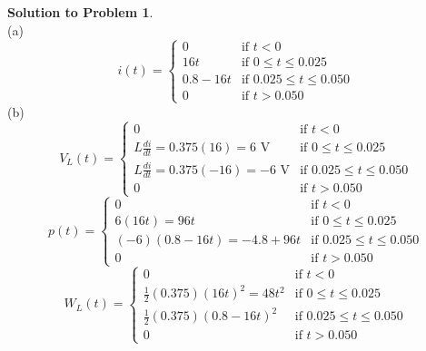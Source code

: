 \documentclass[11pt,letterpaper]{article}
\theoremstyle{definition}
\newtheorem{solprob}{\textcolor{solproblemcolor}{Solution to Problem}}  %
\begin{document}
\noindent\makebox[\linewidth]{\color{rouge_poly}{\rule{\textwidth}{1.3pt}}}

\begin{solprob} \text{}\\
    (a)
    \begin{equation}
    i(t)=\begin{cases}
    0 & \text{if } t<0\\
    16t & \text{if } 0\leq t\leq 0.025\\
    0.8-16t & \text{if } 0.025\leq t \leq 0.050\\
    0 & \text{if } t>0.050
    \end{cases}
    \end{equation}
    (b)
    \begin{equation}
    V_L(t)=\begin{cases}
    0 & \text{if } t<0\\
    L\frac{di}{dt}=0.375(16)=6\text{ V} & \text{if } 0\leq t \leq0.025\\
    L\frac{di}{dt}=0.375(-16)=-6 \text{ V} & \text{if } 0.025\leq t \leq 0.050\\
    0 & \text{if } t>0.050
    \end{cases}
    \end{equation}
    \begin{equation}
    p(t)=\begin{cases}
    0 & \text{if } t<0\\
    6(16t)=96t & \text{if } 0\leq t\leq 0.025\\
    (-6)(0.8-16t)=-4.8+96t & \text{if } 0.025\leq t\leq 0.050\\
    0 & \text{if } t>0.050
    \end{cases}
    \end{equation}
    \begin{equation}
    W_L(t)=\begin{cases}
    0 & \text{if } t<0\\
    \frac{1}{2}(0.375)(16t)^2=48t^2 & \text{if } 0\leq t\leq 0.025\\
    \frac{1}{2}(0.375)(0.8-16t)^2 & \text{if } 0.025\leq t\leq 0.050\\
    0 & \text{if } t>0.050
    \end{cases}
    \end{equation}
\end{solprob} 

\noindent\makebox[\linewidth]{\color{rouge_poly}{\rule{\textwidth}{1.3pt}}}	

\vspace{-5mm}
\end{document}

